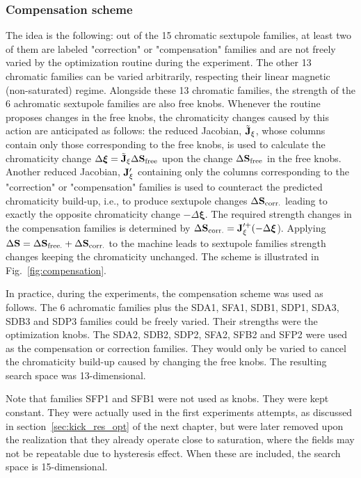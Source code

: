 \subsubsection{Compensation scheme}
\label{subsubsec:compensation}
The idea is the following: out of the 15 chromatic sextupole families, at least two of them are labeled "correction" or "compensation" families and are not freely varied by the optimization routine during the experiment. The other 13 chromatic families can be varied arbitrarily, respecting their linear magnetic (non-saturated) regime. Alongside these 13 chromatic families, the strength of the 6 achromatic sextupole families are also free knobs.  Whenever the routine proposes changes in the free knobs, the chromaticity changes caused by this action are anticipated as follows: the reduced Jacobian, $\tilde{\vb{J}}_\xi$, whose columns contain only those corresponding to the free knobs, is used to calculate the chromaticity change $\Delta \boldsymbol{\xi}=\tilde{\vb{J}}_\xi\Delta\vb{S}_{\text{free}}$ upon the change $\Delta\vb{S}_{\text{free}}$ in the free knobs. Another reduced Jacobian, $\vb{J}_{\xi}^{\prime}$ containing only the columns corresponding to the "correction" or "compensation" families is used to counteract the predicted chromaticity build-up, i.e., to produce sextupole changes $\Delta\vb{S}_{\text{corr.}}$ leading to exactly the opposite chromaticity change $-\Delta \boldsymbol{\xi}$. The required strength changes in the compensation families is determined by $\Delta \vb{S}_{\text{corr.}} = \vb{J}_{\xi}^{\prime +}(-\Delta \boldsymbol{\xi}$). Applying $\Delta \vb{S} = \Delta \vb{S}_{\text{free.}} + \Delta \vb{S}_{\text{corr.}}$ to the machine leads to sextupole families strength changes keeping the chromaticity unchanged. The scheme is illustrated in Fig.~\ref{fig:compensation}.

In practice, during the experiments, the compensation scheme was used as follows. The 6 achromatic families plus the SDA1, SFA1, SDB1, SDP1, SDA3, SDB3 and SDP3 families could be freely varied. Their strengths were the optimization knobs. The SDA2, SDB2, SDP2, SFA2, SFB2 and SFP2 were used as the compensation or correction families. They would only be varied to cancel the chromaticity build-up caused by changing the free knobs. The resulting search space was 13-dimensional.

 Note that families SFP1 and SFB1 were not used as knobs. They were kept constant. They were actually used in the first experiments attempts, as discussed in section~\ref{sec:kick_res_opt} of the next chapter, but were later removed upon the realization that they already operate close to saturation, where the fields may not be repeatable due to hysteresis effect. When these are included, the search space is 15-dimensional.

